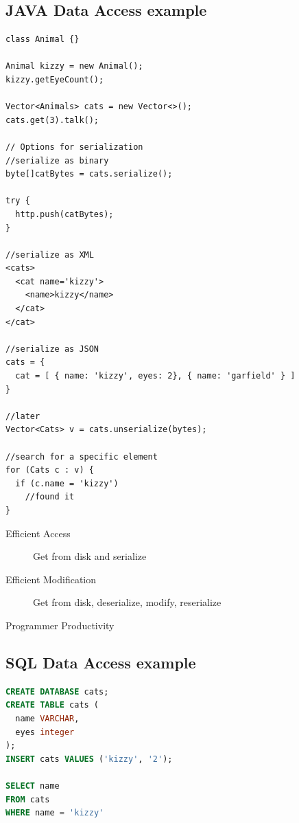 \documentclass{article}
\begin{document}
\subsection{JAVA Data Access example}
\begin{lstlisting}
class Animal {}

Animal kizzy = new Animal();
kizzy.getEyeCount();

Vector<Animals> cats = new Vector<>();
cats.get(3).talk();

// Options for serialization
//serialize as binary
byte[]catBytes = cats.serialize();

try {
  http.push(catBytes);
}

//serialize as XML
<cats>
  <cat name='kizzy'>
    <name>kizzy</name>
  </cat>
</cat>

//serialize as JSON
cats = {
  cat = [ { name: 'kizzy', eyes: 2}, { name: 'garfield' } ]
}

//later
Vector<Cats> v = cats.unserialize(bytes);

//search for a specific element
for (Cats c : v) {
  if (c.name = 'kizzy')
    //found it
}

\end{lstlisting}

\begin{description}
  \item[Efficient Access]{Get from disk and serialize}
  \item[Efficient Modification]{Get from disk, deserialize, modify, reserialize}
  \item[Programmer Productivity]{}
\end{description}

\subsection{SQL Data Access example}
\begin{samepage}
  \begin{lstlisting}[language=SQL]
CREATE DATABASE cats;
CREATE TABLE cats (
  name VARCHAR,
  eyes integer
);
INSERT cats VALUES ('kizzy', '2');

SELECT name
FROM cats
WHERE name = 'kizzy'
\end{lstlisting}
\end{samepage}
\end{document}
